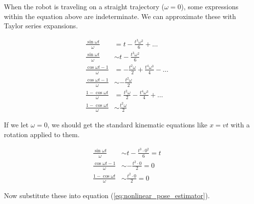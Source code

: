 When the robot is traveling on a straight trajectory ($\omega = 0$), some
expressions within the equation above are indeterminate. We can approximate
these with Taylor series expansions.

\begin{align*}
  \frac{\sin\omega t}{\omega} &= t - \frac{t^3 \omega^2}{6} + \ldots \\
  \frac{\sin\omega t}{\omega} &\sim t - \frac{t^3 \omega^2}{6} \\
  \frac{\cos\omega t - 1}{\omega} &= -\frac{t^2 \omega}{2} + \frac{t^4 \omega^3}{4} - \ldots \\
  \frac{\cos\omega t - 1}{\omega} &\sim -\frac{t^2 \omega}{2} \\
  \frac{1 - \cos\omega t}{\omega} &= \frac{t^2 \omega}{2} - \frac{t^4 \omega^3}{4} + \ldots \\
  \frac{1 - \cos\omega t}{\omega} &\sim \frac{t^2 \omega}{2}
\end{align*}

If we let $\omega = 0$, we should get the standard kinematic equations like
$x = vt$ with a rotation applied to them.

\begin{align*}
  \frac{\sin\omega t}{\omega} &\sim t - \frac{t^3 \cdot 0^2}{6} = t \\
  \frac{\cos\omega t - 1}{\omega} &\sim -\frac{t^2 \cdot 0}{2} = 0 \\
  \frac{1 - \cos\omega t}{\omega} &\sim \frac{t^2 \cdot 0}{2} = 0
\end{align*}

Now substitute these into equation (\ref{eq:nonlinear_pose_estimator}).

